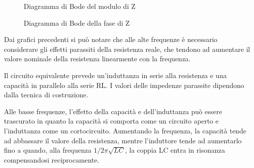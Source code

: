 \begin{figure}[h]
    \centering
    \caption{Diagramma di Bode del modulo di Z}
    \label{fig:modulo}
\end{figure}

\begin{figure}[h]
    \centering
    \caption{Diagramma di Bode della fase di Z}
    \label{fig:fase}
\end{figure}

Dai grafici precedenti si può notare che alle alte frequenze è necessario considerare gli effetti parassiti della resistenza reale, che tendono ad aumentare il valore nominale della resistenza linearmente con la frequenza.

Il circuito equivalente prevede un'induttanza in serie alla resistenza e una capacità in parallelo alla serie RL. I valori delle impedenze parassite dipendono dalla tecnica di costruzione.

Alle basse frequenze, l'effetto della capacità e dell'induttanza può essere trascurato in quanto la capacità si comporta come un circuito aperto e l'induttanza come un cortocircuito. Aumentando la frequenza, la capacità tende ad abbassare il valore della resistenza, mentre l'induttore tende ad aumentarlo fino a quando, alla frequenza $1/2\pi\sqrt{LC}$, la coppia LC entra in risonanza compensandosi reciprocamente.


